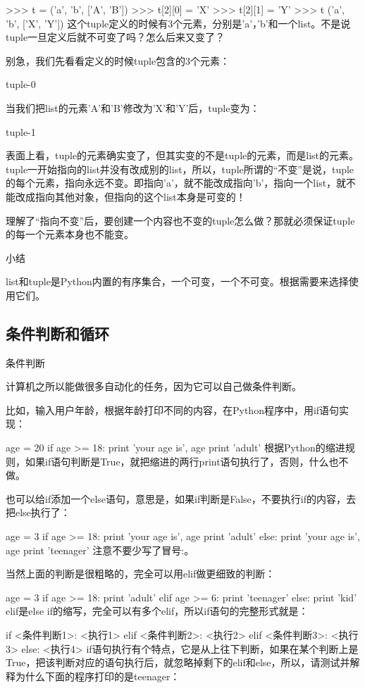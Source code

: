 >>> t = ('a', 'b', ['A', 'B'])
>>> t[2][0] = 'X'
>>> t[2][1] = 'Y'
>>> t
('a', 'b', ['X', 'Y'])
这个tuple定义的时候有3个元素，分别是'a'，'b'和一个list。不是说tuple一旦定义后就不可变了吗？怎么后来又变了？

别急，我们先看看定义的时候tuple包含的3个元素：

tuple-0

当我们把list的元素'A'和'B'修改为'X'和'Y'后，tuple变为：

tuple-1

表面上看，tuple的元素确实变了，但其实变的不是tuple的元素，而是list的元素。tuple一开始指向的list并没有改成别的list，所以，tuple所谓的“不变”是说，tuple的每个元素，指向永远不变。即指向'a'，就不能改成指向'b'，指向一个list，就不能改成指向其他对象，但指向的这个list本身是可变的！

理解了“指向不变”后，要创建一个内容也不变的tuple怎么做？那就必须保证tuple的每一个元素本身也不能变。

小结

list和tuple是Python内置的有序集合，一个可变，一个不可变。根据需要来选择使用它们。




\subsection{条件判断和循环}
条件判断

计算机之所以能做很多自动化的任务，因为它可以自己做条件判断。

比如，输入用户年龄，根据年龄打印不同的内容，在Python程序中，用if语句实现：

age = 20
if age >= 18:
    print 'your age is', age
    print 'adult'
根据Python的缩进规则，如果if语句判断是True，就把缩进的两行print语句执行了，否则，什么也不做。

也可以给if添加一个else语句，意思是，如果if判断是False，不要执行if的内容，去把else执行了：

age = 3
if age >= 18:
    print 'your age is', age
    print 'adult'
else:
    print 'your age is', age
    print 'teenager'
注意不要少写了冒号:。

当然上面的判断是很粗略的，完全可以用elif做更细致的判断：

age = 3
if age >= 18:
    print 'adult'
elif age >= 6:
    print 'teenager'
else:
    print 'kid'
elif是else if的缩写，完全可以有多个elif，所以if语句的完整形式就是：

if <条件判断1>:
    <执行1>
elif <条件判断2>:
    <执行2>
elif <条件判断3>:
    <执行3>
else:
    <执行4>
if语句执行有个特点，它是从上往下判断，如果在某个判断上是True，把该判断对应的语句执行后，就忽略掉剩下的elif和else，所以，请测试并解释为什么下面的程序打印的是teenager：

